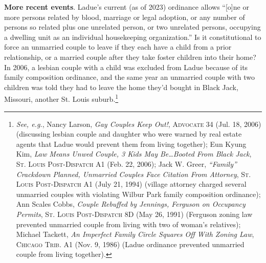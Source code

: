 \item \textbf{More recent events}. Ladue's current (as of 2023) ordinance allows
``[o]ne or more persons related by blood, marriage or legal adoption, or any
number of persons so related plus one unrelated person, or two unrelated
persons, occupying a dwelling unit as an individual housekeeping
organization.'' Is it constitutional to force an unmarried couple to leave if
they each have a child from a prior relationship, or a married couple after they
take foster children into their home? In 2006, a lesbian couple with a child was
excluded from Ladue because of its family composition ordinance, and the same
year an unmarried couple with two children was told they had to leave the home
they'd bought in Black Jack, Missouri, another St. Louis
suburb.\footnote{\textit{See, e.g.}, Nancy Larson, \textit{Gay Couples Keep
Out!}, \textsc{Advocate} 34 (Jul. 18, 2006) (discussing lesbian couple and
daughter who were warned by real estate agents that Ladue would prevent them
from living together); Eun Kyung Kim, \textit{Law Means Unwed Couple, 3 Kids May
Be\ldots Booted From Black Jack}, \textsc{St. Louis Post-Dispatch} A1 (Feb. 22,
2006); Jack W. Greer, \textit{``Family'' Crackdown Planned, Unmarried Couples
Face Citation From Attorney}, \textsc{St. Louis Post-Dispatch} A1 (July 21,
1994) (village attorney charged several unmarried couples with violating Wilbur
Park family composition ordinance); Ann Scales Cobbs, \textit{Couple Rebuffed by
Jennings, Ferguson on Occupancy Permits}, \textsc{St. Louis Post-Dispatch} 8D
(May 26, 1991) (Ferguson zoning law prevented unmarried couple from living with
two of woman's relatives); Michael Tackett, \textit{An Imperfect Family Circle
Squares Off With Zoning Law}, \textsc{Chicago Trib.} A1 (Nov. 9, 1986) (Ladue
ordinance prevented unmarried couple from living together).}  

